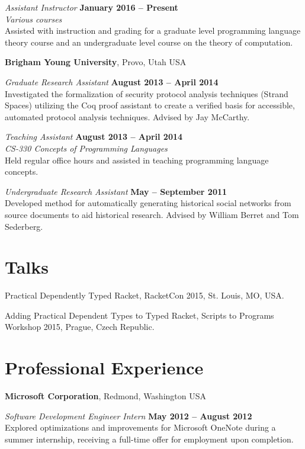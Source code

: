 \documentclass[margin,line]{res}
\begin{document}
\begin{resume}
{\em Assistant Instructor} \hfill {\bf January 2016 -- Present}\\ {\em
  Various courses}\\ Assisted with instruction and grading for a
graduate level programming language theory course and an undergraduate
level course on the theory of computation.

{\bf Brigham Young University}, Provo, Utah USA

\vspace{-.3cm}

{\em Graduate Research Assistant} \hfill {\bf August 2013 -- April
  2014}\\ Investigated the formalization of security protocol analysis
techniques (Strand Spaces) utilizing the Coq proof assistant to create
a verified basis for accessible, automated protocol analysis
techniques. Advised by Jay McCarthy.

{\em Teaching Assistant} \hfill {\bf August 2013 -- April 2014}\\ {\em
  CS-330 Concepts of Programming Languages}\\ Held regular office hours
and assisted in teaching programming language concepts.


{\em Undergraduate Research Assistant} \hfill {\bf May -- September
  2011}\\ Developed method for automatically generating historical
social networks from source documents to aid historical
research. Advised by William Berret and Tom Sederberg.

\section{\sc Talks}
Practical Dependently Typed Racket, RacketCon 2015, St. Louis, MO, USA.

Adding Practical Dependent Types to Typed Racket, Scripts to Programs Workshop 2015, Prague, Czech Republic.

\section{\sc Professional Experience}
{\bf Microsoft Corporation}, Redmond, Washington USA

\vspace{-.3cm}
{\em Software Development Engineer Intern} \hfill {\bf May 2012 -- August 2012}\\
Explored optimizations and improvements for Microsoft OneNote during a
summer internship, receiving a full-time offer for employment upon completion.


\end{resume}
\end{document}
